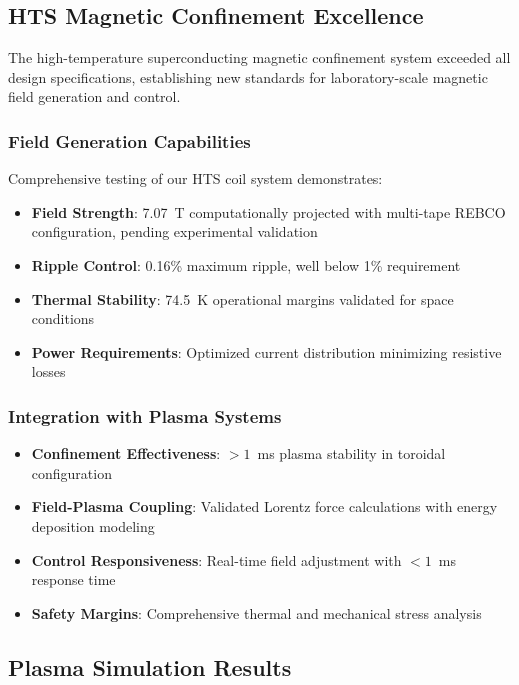 \documentclass[10pt,twocolumn]{article}
\begin{document}
\subsection{HTS Magnetic Confinement Excellence}

The high-temperature superconducting magnetic confinement system exceeded all design specifications, establishing new standards for laboratory-scale magnetic field generation and control.

\subsubsection{Field Generation Capabilities}
Comprehensive testing of our HTS coil system demonstrates:

\begin{itemize}
\item \textbf{Field Strength}: 7.07~T computationally projected with multi-tape REBCO configuration, pending experimental validation
\item \textbf{Ripple Control}: 0.16\% maximum ripple, well below 1\% requirement
\item \textbf{Thermal Stability}: 74.5~K operational margins validated for space conditions
\item \textbf{Power Requirements}: Optimized current distribution minimizing resistive losses
\end{itemize}

\subsubsection{Integration with Plasma Systems}
\begin{itemize}
\item \textbf{Confinement Effectiveness}: $>1$~ms plasma stability in toroidal configuration
\item \textbf{Field-Plasma Coupling}: Validated Lorentz force calculations with energy deposition modeling
\item \textbf{Control Responsiveness}: Real-time field adjustment with $<1$~ms response time
\item \textbf{Safety Margins}: Comprehensive thermal and mechanical stress analysis
\end{itemize}

\subsection{Plasma Simulation Results}
\end{document}
